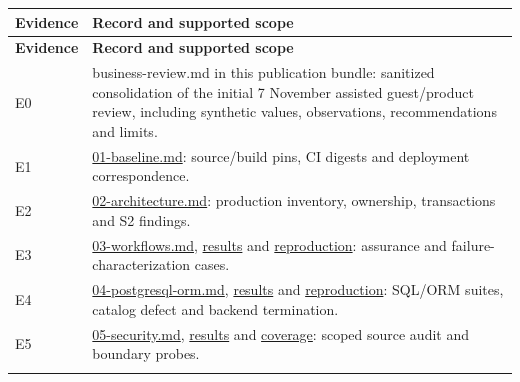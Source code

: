 \documentclass[11pt,a4paper]{article}
\begin{document}
{\fontsize{9.5}{11.5}\selectfont
\begin{longtable}{@{}>{\raggedright\arraybackslash}p{}>{\raggedright\arraybackslash}p{}@{}}\toprule
\textbf{Evidence} & \textbf{Record and supported scope} \\ \midrule\endfirsthead
\toprule\textbf{Evidence} & \textbf{Record and supported scope} \\ \midrule\endhead
\bottomrule\endfoot
E0 & business-review.md in this publication bundle: sanitized consolidation of the initial 7 November assisted guest/\allowbreak{}product review, including synthetic values, observations, recommendations and limits. \\ \addlinespace[3pt]
E1 & \href{https://github.com/finance-lab-project/app/blob/7edfb504d98ebe88df51a92124e217573addbd41/docs/review/01-baseline.md}{01-baseline.md}: source/\allowbreak{}build pins, CI digests and deployment correspondence. \\ \addlinespace[3pt]
E2 & \href{https://github.com/finance-lab-project/app/blob/7edfb504d98ebe88df51a92124e217573addbd41/docs/review/02-architecture.md}{02-architecture.md}: production inventory, ownership, transactions and S2 findings. \\ \addlinespace[3pt]
E3 & \href{https://github.com/finance-lab-project/app/blob/7edfb504d98ebe88df51a92124e217573addbd41/docs/review/03-workflows.md}{03-workflows.md}, \href{https://github.com/finance-lab-project/app/blob/7edfb504d98ebe88df51a92124e217573addbd41/docs/review/evidence/step-3/results.json}{results} and \href{https://github.com/finance-lab-project/app/tree/7edfb504d98ebe88df51a92124e217573addbd41/docs/review/reproductions/step-3}{reproduction}: assurance and failure-characterization cases. \\ \addlinespace[3pt]
E4 & \href{https://github.com/finance-lab-project/app/blob/7edfb504d98ebe88df51a92124e217573addbd41/docs/review/04-postgresql-orm.md}{04-postgresql-orm.md}, \href{https://github.com/finance-lab-project/app/blob/7edfb504d98ebe88df51a92124e217573addbd41/docs/review/evidence/step-4/results.json}{results} and \href{https://github.com/finance-lab-project/app/tree/7edfb504d98ebe88df51a92124e217573addbd41/docs/review/reproductions/step-4}{reproduction}: SQL/\allowbreak{}ORM suites, catalog defect and backend termination. \\ \addlinespace[3pt]
E5 & \href{https://github.com/finance-lab-project/app/blob/7edfb504d98ebe88df51a92124e217573addbd41/docs/review/05-security.md}{05-security.md}, \href{https://github.com/finance-lab-project/app/blob/7edfb504d98ebe88df51a92124e217573addbd41/docs/review/evidence/step-5/results.json}{results} and \href{https://github.com/finance-lab-project/app/blob/7edfb504d98ebe88df51a92124e217573addbd41/docs/review/evidence/step-5/source-coverage.json}{coverage}: scoped source audit and boundary probes. \\ \addlinespace[3pt]

\end{longtable}}
\end{document}
